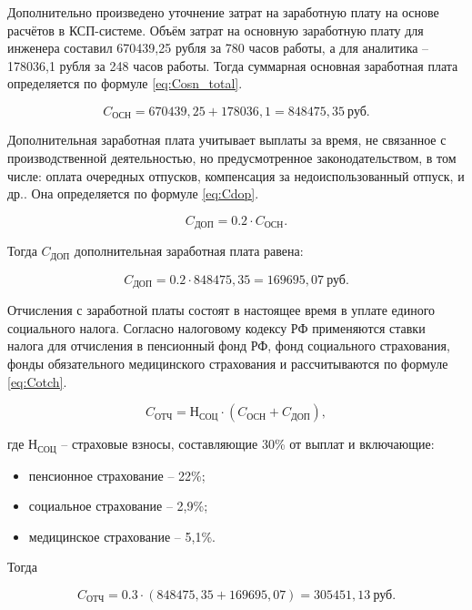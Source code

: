 Дополнительно произведено уточнение затрат на заработную плату на основе расчётов в КСП-системе. Объём затрат на основную заработную плату для инженера составил 670439{,}25 рубля за 780 часов работы, а для аналитика -- 178036{,}1 рубля за 248 часов работы. Тогда суммарная основная заработная плата определяется по формуле \eqref{eq:Cosn_total}.

\begin{equation}\label{eq:Cosn_total}
C_{\text{ОСН}} = 670439{,}25 + 178036{,}1 = 848475{,}35 \ \text{руб.}
\end{equation}

Дополнительная заработная плата учитывает выплаты за время, не связанное с производственной деятельностью, но предусмотренное законодательством,  в том числе: оплата очередных отпусков, компенсация за недоиспользованный отпуск, и др.. Она определяется по формуле \eqref{eq:Cdop}.

\begin{equation}\label{eq:Cdop}
C_{\text{ДОП}} = 0.2 \cdot C_{\text{ОСН}}.
\end{equation}

Тогда $C_{\text{ДОП}}$ дополнительная заработная плата равена:

$$
C_{\text{ДОП}} = 0.2 \cdot 848475{,}35 = 169695{,}07 \ \text{руб.}
$$

Отчисления с заработной платы состоят в настоящее время в уплате единого социального налога. Согласно налоговому кодексу РФ применяются ставки налога для отчисления в пенсионный фонд РФ, фонд социального страхования, фонды обязательного медицинского страхования и рассчитываются по формуле \eqref{eq:Cotch}.

\begin{equation}\label{eq:Cotch}
C_{\text{ОТЧ}} = \text{Н}_{\text{СОЦ}} \cdot (C_{\text{ОСН}} + C_{\text{ДОП}}),
\end{equation}

где $\text{Н}_{\text{СОЦ}}$ -- страховые взносы, составляющие 30\% от выплат и включающие:
\begin{itemize}
    \item пенсионное страхование -- 22\%;
    \item социальное страхование -- 2{,}9\%;
    \item медицинское страхование -- 5{,}1\%.
\end{itemize}

Тогда

$$
C_{\text{ОТЧ}} = 0.3 \cdot (848475{,}35 + 169695{,}07) = 305451{,}13 \ \text{руб.}
$$

